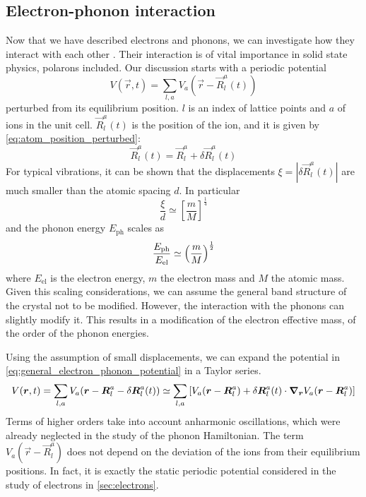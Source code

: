\subsection{Electron-phonon interaction} \label{sec:electrons_phonons_interaction}
Now that we have described electrons and phonons, we can investigate how they interact with each other \cite{cohenFundamentalsCondensedMatter, tempere}. Their interaction is of vital importance in solid state physics, polarons included. Our discussion starts with a periodic potential
\begin{equation} \label{eq:general_electron_phonon_potential}
    V(\vec{r}, t) = \sum_{l,a} V_a(\vec{r} - \vec{R}_l^a(t))
\end{equation}
perturbed from its equilibrium position. $l$ is an index of lattice points and $a$ of ions in the unit cell. $\vec{R}_l^a(t)$ is the position of the ion, and it is given by \cref{eq:atom_position_perturbed}:
\begin{equation}
    \vec{R}_l^a(t) = \vec{R}_l^a + \delta \vec{R}_l^a(t)
\end{equation}
For typical vibrations, it can be shown that the displacements $\xi = |\delta \vec{R}_l^a(t)|$ are much smaller than the atomic spacing $d$. In particular
\begin{equation}
    \frac{\xi}{d} \simeq \left[ \frac{m}{M} \right]^\frac{1}{4}
\end{equation}
and the phonon energy $E_\text{ph}$ scales as
\begin{equation}
    \frac{E_\text{ph}}{E_\text{el}} \simeq \left( \frac{m}{M} \right)^{\frac{1}{2}}
\end{equation}
where $E_\text{el}$ is the electron energy, $m$ the electron mass and $M$ the atomic mass. Given this scaling considerations, we can assume the general band structure of the crystal not to be modified. However, the interaction with the phonons can slightly modify it. This results in a modification of the electron effective mass, of the order of the phonon energies.

Using the assumption of small displacements, we can expand the potential in \cref{eq:general_electron_phonon_potential} in a Taylor series.
\begin{multline}
    V(\mathbf{\boldsymbol{r}}, t) = \sum_{l,a} V_a(\mathbf{\boldsymbol{r}} - \mathbf{\boldsymbol{R}}_l^a - \delta \mathbf{\boldsymbol{R}}_l^a(t))
    \simeq \sum_{l,a} \left[ V_a(\mathbf{\boldsymbol{r}} - \mathbf{\boldsymbol{R}}_l^a) + \delta \mathbf{\boldsymbol{R}}_l^a(t) \cdot \grad_{\mathbf{\boldsymbol{r}}} V_a(\mathbf{\boldsymbol{r}} - \mathbf{\boldsymbol{R}}_l^a) \right]
\end{multline}
Terms of higher orders take into account anharmonic oscillations, which were already neglected in the study of the phonon Hamiltonian. The term $V_a(\vec{r} - \vec{R}_l^a)$ does not depend on the deviation of the ions from their equilibrium positions. In fact, it is exactly the static periodic potential considered in the study of electrons in \cref{sec:electrons}.

